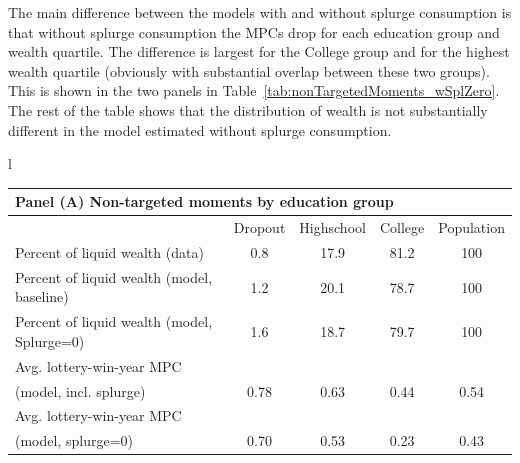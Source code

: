 The main difference between the models with and without splurge consumption is that without splurge consumption the MPCs drop for each education group and wealth quartile.
The difference is largest for the College group and for the highest wealth quartile (obviously with substantial overlap between these two groups).
This is shown in the two panels in Table~\ref{tab:nonTargetedMoments_wSplZero}.
The rest of the table shows that the distribution of wealth is not substantially different in the model estimated without splurge consumption.


\begin{table}[th]
	\begin{center}
		\begin{tabular}{l}
			\begin{tabular}{lcccc}
				\multicolumn{5}{l}{Panel (A) Non-targeted moments by education group} \\ \midrule
				& Dropout & Highschool & College & Population \\ \midrule
				Percent of liquid wealth (data) & 0.8 & 17.9 & 81.2 & 100 \\
				Percent of liquid wealth (model, baseline) & 1.2 & 20.1 & 78.7 & 100 \\
				Percent of liquid wealth (model, Splurge=0) & 1.6 & 18.7 & 79.7 & 100 \\
				Avg. lottery-win-year MPC \\ (model, incl. splurge) & 0.78 & 0.63 & 0.44 & 0.54 \\ 
				Avg. lottery-win-year MPC \\ (model, splurge=0) & 0.70 & 0.53 & 0.23 & 0.43
				\\ \bottomrule 
			\end{tabular} \\ \\ 
			

\end{tabular}
\end{center}
\end{table}

